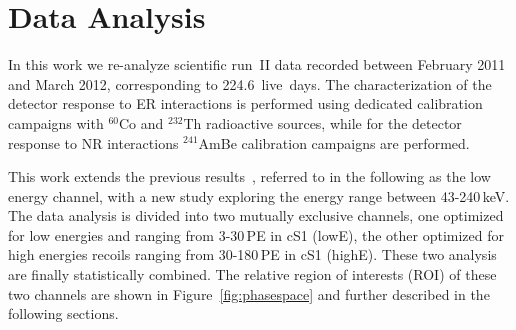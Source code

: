 \section{Data Analysis}
\label{sec:Analysis}
In this work we re-analyze  scientific run~II data recorded between February 2011 and March 2012, 
corresponding to 224.6~live~days. The characterization of the detector response to ER interactions is performed using dedicated calibration campaigns with $^{60}$Co and $^{232}$Th radioactive sources, while for the detector response to NR interactions $^{241}$AmBe calibration campaigns are performed.

 
This work extends the previous results~\cite{xe100_run10_si,xe100_run_combination}, referred to in the following as the low energy channel, with a new study exploring the energy range between 43-240\,keV. 
The data analysis is divided into two mutually exclusive channels, one optimized for low energies and ranging from 3-30\,PE in cS1 (lowE), 
the other optimized for high energies recoils ranging from 30-180\,PE in cS1 (highE).  These two analysis are finally statistically combined. 
The relative region of interests (ROI) of these two channels are shown in Figure~\ref{fig:phasespace} and further described in the following sections. 



